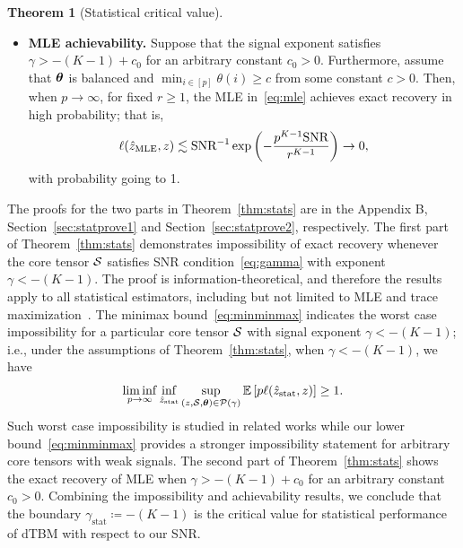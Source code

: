 \documentclass[journal]{IEEEtran}
\theoremstyle{definition}
\newtheorem{thm}{Theorem}
\theoremstyle{definition}
\begin{document}
\begin{thm}[Statistical critical value]
\begin{itemize}[wide]
\item \textbf{MLE achievability.} 
Suppose that the signal exponent satisfies $\gamma >-(K-1)+c_0$ for an arbitrary constant {$c_0>0$}. Furthermore, assume that {$\boldsymbol{\theta}$} is balanced and $\min_{i\in[p]}\theta(i)\geq c$ from some constant $c>0$. Then, {when $p \rightarrow \infty$, for fixed $r \geq 1$, }the MLE in~\eqref{eq:mle} achieves exact recovery in high probability; that is,
\begin{equation}
\ell(\hat z_{\text{MLE}}, z) \lesssim \text{SNR}^{-1}\exp\left(-{p^{K-1}\text{SNR}\over r^{K-1}}\right) \to 0,
\end{equation}
with probability going to 1. 
\end{itemize}
\end{thm}

The proofs for the two parts in Theorem~\ref{thm:stats} are in the Appendix B, Section~\ref{sec:statprove1} and Section~\ref{sec:statprove2}, respectively. The first part of Theorem~\ref{thm:stats} demonstrates impossibility of exact recovery whenever the core tensor $\mathcal{S}$ satisfies SNR condition~\eqref{eq:gamma} with exponent $\gamma < -(K-1)$. The proof is information-theoretical, and therefore the results apply to all statistical estimators, including but not limited to MLE and trace maximization~\citep{ghoshdastidar2017uniform}. The minimax bound~\eqref{eq:minminmax} indicates the worst case impossibility for a particular core tensor $\mathcal{S}$ with signal exponent $\gamma < -(K-1)$; i.e., under the assumptions of Theorem~\ref{thm:stats}, when $\gamma < -(K-1)$, we have 
\begin{equation}
    \liminf_{p \rightarrow \infty}  \inf_{\hat z_{\text{stat}}}\sup_{ (z,\mathcal{S}, \boldsymbol{\theta}) \in \mathcal{P}(\gamma)} \mathbb{E} \left[ p\ell(\hat z_{\text{stat}}, z) \right]\geq 1.
\end{equation}
Such worst case impossibility is studied in related works \citep{han2020exact, gao2018community} while our lower bound~\eqref{eq:minminmax} provides a stronger impossibility statement for arbitrary core tensors with weak signals. The second part of Theorem~\ref{thm:stats} shows the exact recovery of MLE when $\gamma>-(K-1)+c_0$ for an arbitrary constant $c_0>0$. Combining the impossibility and achievability results, we conclude that the boundary $\gamma_{\text{stat}} \coloneqq -(K-1)$ is the critical value for statistical performance of dTBM with respect to our SNR.
\end{document}

